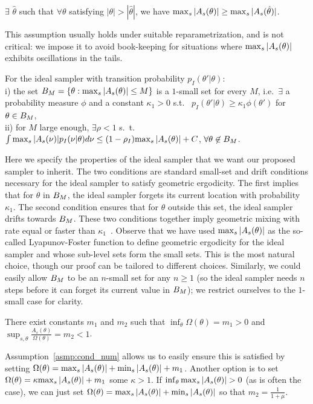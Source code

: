 \begin{assumption}
  $\exists$ $\hat{\theta}$ such that $\forall \theta$ satisfying 
  $|\theta| > |\hat{\theta}|$, we have ${\max_s |A_s(\theta)|} \ge
  {\max_s |A_s(\hat{\theta})|}$.
  \label{asmp:mono_tail}
\end{assumption}
\noindent This assumption usually holds under suitable reparametrization,
and is not critical: we impose it to avoid book-keeping for 
situations where ${\max_s |A_s(\theta)|}$ exhibits oscillations in the tails.

\begin{assumption}
For the ideal sampler with transition probability $p_I(\theta'|\theta)$: \\
i) the set $B_M=\{\theta:{\max_s |A_s(\theta)|}\le M \}$ is a $1$-small set for 
every
$M$, i.e.\ $\exists$ a probability measure $\phi$ and a constant 
$\kappa_1 > 0$ s.t.\ %
$p_I(\theta'|\theta) \geq \kappa_1 \phi(\theta')$ for $\theta \in B_M$, \\
ii) for $M$ large enough, $\exists \rho < 1$ s.\ t.\
$\int {\max_s |A_s(\nu)|} p_I(\nu|\theta) d\nu 
\leq (1-\rho_I) {\max_s |A_s(\theta)|}+C$, $\forall \theta \not\in B_M$.
  \label{asmp:ideal_geom}
\end{assumption}
\noindent Here we specify the properties of the ideal sampler that we
want our proposed sampler to inherit. The two conditions are standard 
small-set and drift conditions necessary for the ideal sampler to satisfy 
geometric ergodicity. The first implies that for $\theta$ in 
$B_M$, the ideal sampler forgets its current
location with probability $\kappa_1$. The second condition ensures that
for $\theta$ outside this set, the ideal sampler drifts towards 
$B_M$. These two conditions together imply geometric
mixing with rate equal or faster than $\kappa_1$~\cite{meyn2012markov}. 
Observe that we have used ${\max_s |A_s(\theta)|}$ as the so-called Lyapunov-Foster 
function to define geometric ergodicity for the ideal sampler and whose
sub-level sets form the small sets. This is the most natural choice, 
though our proof can be tailored to different choices. Similarly, we 
could easily allow $B_M$ to be an $n$-small set for any $n\ge 1$ (so 
the ideal sampler needs $n$ steps before it can forget its current 
value in $B_M$); we restrict ourselves to the $1$-small case for 
clarity.


\begin{assumption}
  There exist constants $m_1$ and $m_2$ such that 
  $\inf_\theta \Omega(\theta) = m_1 > 0$ and $\sup_{s,\theta}
  \frac{A_s(\theta)}{\Omega(\theta)} = m_2 < 1$. 
  \label{asmp:low_bnd}
\end{assumption}
\noindent 
Assumption~\ref{asmp:cond_num} allows us to easily ensure this is 
satisfied by setting $\Omega(\theta) = {\max_s |A_s(\theta)|} + {\min_s |A_s(\theta)|}+m_1$. 
Another option is to set $\Omega(\theta) = \kappa{\max_s |A_s(\theta)|} + m_1$ some 
$\kappa > 1$.  If $\inf_\theta {\max_s |A_s(\theta)|} > 0$ (as is often the case), 
we can just set $\Omega(\theta) = {\max_s |A_s(\theta)|} + {\min_s |A_s(\theta)|}$ so that 
$m_2 = \frac{1}{1+\mu}$. 


